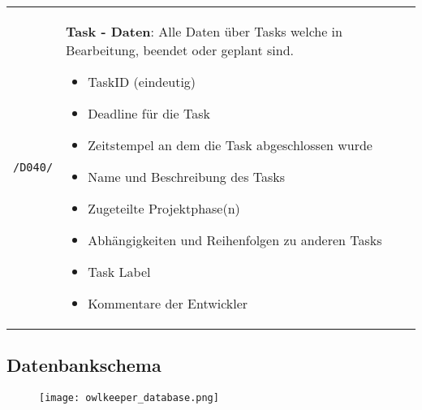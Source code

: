 \clearpage
\begin{tabularx}{\linewidth}{s X}
	\texttt{/D040/} & \textbf{Task - Daten}: Alle Daten über Tasks welche in Bearbeitung, beendet oder geplant sind.
	\begin{itemize}
		\item TaskID (eindeutig)
		\item Deadline für die Task
		\item Zeitstempel an dem die Task abgeschlossen wurde
		\item Name und Beschreibung des Tasks
		\item Zugeteilte Projektphase(n)
		\item Abhängigkeiten und Reihenfolgen zu anderen Tasks
		\item Task Label
		\item Kommentare der Entwickler
	\end{itemize}
\end{tabularx}
\subsection{Datenbankschema}
\begin{figure*}[h!]
	\centering
	\texttt{[image: owlkeeper\_database.png]}
\end{figure*}

